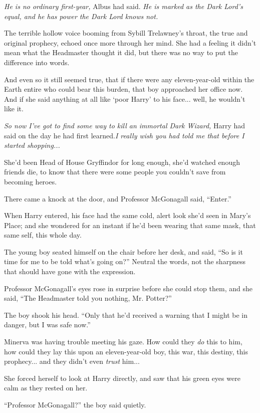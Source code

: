 \emph{He is no ordinary first-year,} Albus had said. \emph{He is marked
as the Dark Lord's equal, and he has power the Dark Lord knows not.}

The terrible hollow voice booming from Sybill Trelawney's throat, the
true and original prophecy, echoed once more through her mind. She had a
feeling it didn't mean what the Headmaster thought it did, but there was
no way to put the difference into words.

And even so it still seemed true, that if there were any eleven-year-old
within the Earth entire who could bear this burden, that boy approached
her office now. And if she said anything at all like `poor Harry' to his
face... well, he wouldn't like it.

\emph{So now I've got to find some way to kill an immortal Dark Wizard,}
Harry had said on the day he had first learned.\emph{I really wish you
had told me that before I started shopping...}

She'd been Head of House Gryffindor for long enough, she'd watched
enough friends die, to know that there were some people you couldn't
save from becoming heroes.

There came a knock at the door, and Professor McGonagall said,
``Enter.''

When Harry entered, his face had the same cold, alert look she'd seen in
Mary's Place; and she wondered for an instant if he'd been wearing that
same mask, that same self, this whole day.

The young boy seated himself on the chair before her desk, and said,
``So is it time for me to be told what's going on?'' Neutral the words,
not the sharpness that should have gone with the expression.

Professor McGonagall's eyes rose in surprise before she could stop them,
and she said, ``The Headmaster told you nothing, Mr. Potter?''

The boy shook his head. ``Only that he'd received a warning that I might
be in danger, but I was safe now.''

Minerva was having trouble meeting his gaze. How could they \emph{do}
this to him, how could they lay this upon an eleven-year-old boy, this
war, this destiny, this prophecy... and they didn't even
\emph{trust} him...

She forced herself to look at Harry directly, and saw that his green
eyes were calm as they rested on her.

``Professor McGonagall?'' the boy said quietly.

